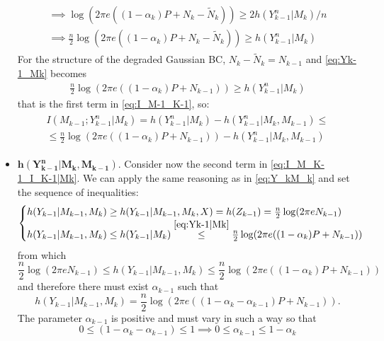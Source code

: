 \begin{itemize}
\begin{align}
\begin{split}
      \implies
      \log(2\pi e ((1-\alpha_k) P+N_k-\tilde{N}_k))\geq 2h(Y^n_{k-1}|M_k)/n\\
      \implies
      \frac{n}{2}\log(2\pi e ((1-\alpha_k) P+N_k-\tilde{N}_k))\geq h(Y^n_{k-1}|M_k)
    \end{split}
    \label{eq:Yk-1_Mk}
  \end{align}
  For the structure of the degraded Gaussian BC, $N_k-\tilde{N}_k=N_{k-1}$ and \eqref{eq:Yk-1_Mk} becomes
  \begin{align}
    \frac{n}{2}\log(2\pi e ((1-\alpha_k) P+N_{k-1}))\geq h(Y^n_{k-1}|M_k)
    \label{eq:Yk-1|Mk}
  \end{align}
  that is the first term in \eqref{eq:I_M-1_K-1}, so:
  \begin{align}
    \begin{split}
        I(M_{k-1};Y^n_{k-1}|M_k) = h(Y_{k-1}^n|M_{k}) - h(Y_{k-1}^n|M_k,M_{k-1})\leq\\
        \leq \frac{n}{2}\log(2\pi e ((1-\alpha_k) P+N_{k-1})) - h(Y_{k-1}^n|M_k,M_{k-1})
    \end{split}
    \label{eq:final_1}
  \end{align}
  \item $\mathbf{h(Y_{k-1}^n|M_k,M_{k-1})}$. Consider now the second term in \eqref{eq:I_M_K-1_I_K-1|Mk}. We can apply the same reasoning as in \eqref{eq:Y_kM_k} and set the sequence of inequalities:
  \begin{align}
    \begin{cases}
      h(Y_{k-1}|M_{k-1},M_{k})\geq h(Y_{k-1}|M_{k-1},M_{k},X) =h(Z_{k-1}) = \frac{n}{2}\log(2\pi e N_{k-1}) \\
      h(Y_{k-1}|M_{k-1},M_{k})\leq h(Y_{k-1}|M_{k})\overset{\eqref{eq:Yk-1|Mk}}{\leq} \frac{n}{2}\log(2\pi e ((1-\alpha_k) P+N_{k-1}))
    \end{cases}
  \end{align}
  from which
  \begin{equation}
    \frac{n}{2}\log(2\pi e N_{k-1})\leq h(Y_{k-1}|M_{k-1},M_{k})\leq \frac{n}{2}\log(2\pi e ((1-\alpha_k) P+N_{k-1}))
  \end{equation}
  and therefore there must exist $\alpha_{k-1}$ such that
  \begin{equation}
    h(Y_{k-1}|M_{k-1},M_{k}) = \frac{n}{2}\log(2\pi e ((1-\alpha_k-\alpha_{k-1}) P+N_{k-1})).
    \label{eq:final_2}
  \end{equation}
  The parameter $\alpha_{k-1}$ is positive and must vary in such a way so that
  \begin{equation*}
    0\leq(1-\alpha_k-\alpha_{k-1})\leq 1
    \implies 0\leq\alpha_{k-1}\leq 1-\alpha_k
  \end{equation*}
\end{itemize}
